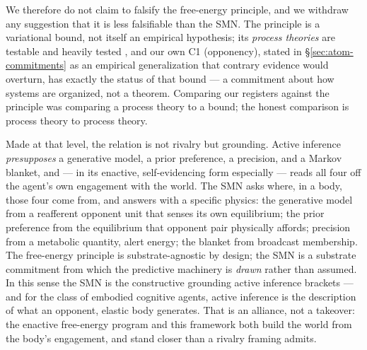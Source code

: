 \documentclass{article}
\begin{document}
We therefore do not claim to falsify the free-energy principle, and we
withdraw any suggestion that it is less falsifiable than the SMN.  The
principle is a variational bound, not itself an empirical hypothesis; its
\emph{process theories} are testable and heavily tested
\citep{Friston2017ProcessTheory}, and our own C1 (opponency), stated in
\S\ref{sec:atom-commitments} as an empirical generalization that contrary
evidence would overturn, has exactly the status of that bound --- a
commitment about how systems are organized, not a theorem.  Comparing our
registers against the principle was comparing a process theory to a
bound; the honest comparison is process theory to process theory.

Made at that level, the relation is not rivalry but grounding.  Active
inference \emph{presupposes} a generative model, a prior preference, a
precision, and a Markov blanket, and --- in its enactive, self-evidencing
form especially
\citep{Hohwy2016SelfEvidencing,Bruineberg2018AnticipatingBrain} --- reads
all four off the agent's own engagement with the world.  The SMN asks
where, in a body, those four come from, and answers with a specific
physics: the generative model from a reafferent opponent unit that senses
its own equilibrium; the prior preference from the equilibrium that
opponent pair physically affords; precision from a metabolic quantity,
alert energy; the blanket from broadcast membership.  The free-energy
principle is substrate-agnostic by design; the SMN is a substrate
commitment from which the predictive machinery is \emph{drawn} rather than
assumed.  In this sense the SMN is the constructive grounding active
inference brackets --- and for the class of embodied cognitive agents,
active inference is the description of what an opponent, elastic body
generates.  That is an alliance, not a takeover: the enactive free-energy
program and this framework both build the world from the body's
engagement, and stand closer than a rivalry framing admits.
\end{document}
